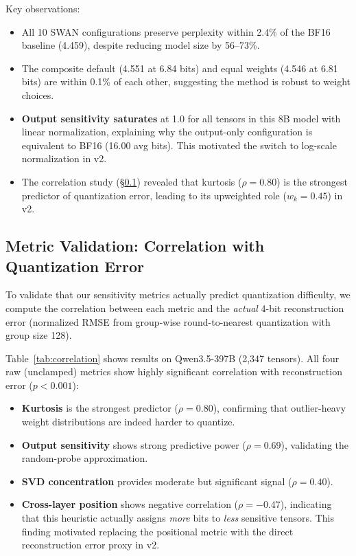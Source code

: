 \documentclass{article}
\begin{document}
Key observations:
\begin{itemize}
    \item All 10 SWAN configurations preserve perplexity within 2.4\% of the BF16 baseline (4.459), despite reducing model size by 56--73\%.
    \item The composite default (4.551 at 6.84 bits) and equal weights (4.546 at 6.81 bits) are within 0.1\% of each other, suggesting the method is robust to weight choices.
    \item \textbf{Output sensitivity saturates} at 1.0 for all tensors in this 8B model with linear normalization, explaining why the output-only configuration is equivalent to BF16 (16.00 avg bits). This motivated the switch to log-scale normalization in v2.
    \item The correlation study (\S\ref{sec:correlation}) revealed that kurtosis ($\rho = 0.80$) is the strongest predictor of quantization error, leading to its upweighted role ($w_k = 0.45$) in v2.
\end{itemize}

\subsection{Metric Validation: Correlation with Quantization Error}
\label{sec:correlation}



To validate that our sensitivity metrics actually predict quantization difficulty, we compute the correlation between each metric and the \emph{actual} 4-bit reconstruction error (normalized RMSE from group-wise round-to-nearest quantization with group size 128).

Table~\ref{tab:correlation} shows results on Qwen3.5-397B (2,347 tensors). All four raw (unclamped) metrics show highly significant correlation with reconstruction error ($p < 0.001$):
\begin{itemize}
    \item \textbf{Kurtosis} is the strongest predictor ($\rho = 0.80$), confirming that outlier-heavy weight distributions are indeed harder to quantize.
    \item \textbf{Output sensitivity} shows strong predictive power ($\rho = 0.69$), validating the random-probe approximation.
    \item \textbf{SVD concentration} provides moderate but significant signal ($\rho = 0.40$).
    \item \textbf{Cross-layer position} shows negative correlation ($\rho = -0.47$), indicating that this heuristic actually assigns \emph{more} bits to \emph{less} sensitive tensors. This finding motivated replacing the positional metric with the direct reconstruction error proxy in v2.
\end{itemize}
\end{document}
